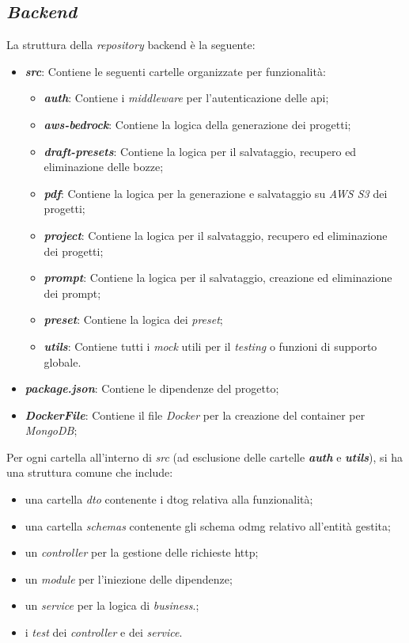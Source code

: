 \subsection{\textit{Backend}}
\label{sez:backend}

La struttura della \textit{repository} \gls{backend} è la seguente:

\begin{itemize}
    \item \textbf{\textit{src}}: Contiene le seguenti cartelle organizzate per funzionalità:
    \begin{itemize}
        \item \textbf{\textit{auth}}: Contiene i \textit{middleware} per l'autenticazione delle \gls{api};
        \item \textbf{\textit{aws-bedrock}}: Contiene la logica della generazione dei progetti;
        \item \textbf{\textit{draft-presets}}: Contiene la logica per il salvataggio, recupero ed eliminazione delle bozze;
        \item \textbf{\textit{pdf}}: Contiene la logica per la generazione e salvataggio su \textit{AWS S3} dei progetti;
        \item \textbf{\textit{project}}: Contiene la logica per il salvataggio, recupero ed eliminazione dei progetti;
        \item \textbf{\textit{prompt}}: Contiene la logica per il salvataggio, creazione ed eliminazione dei \gls{prompt};
        \item \textbf{\textit{preset}}: Contiene la logica dei \textit{preset};
        \item \textbf{\textit{utils}}: Contiene tutti i \textit{mock} utili per il \textit{testing} o funzioni di supporto globale.
    \end{itemize}
    \item \textbf{\textit{package.json}}: Contiene le dipendenze del progetto;
    \item \textbf{\textit{DockerFile}}: Contiene il file \textit{Docker} per la creazione del \gls{container} per \textit{MongoDB};
\end{itemize}

\noindent Per ogni cartella all'interno di \textit{src} (ad esclusione delle cartelle \textbf{\textit{auth}} e \textbf{\textit{utils}}), si ha una struttura comune che include:
\begin{itemize}
    \item una cartella \textit{dto} contenente i \gls{dtog} relativa alla funzionalità;
    \item una cartella \textit{schemas} contenente gli schema \gls{odmg} relativo all'entità gestita;
    \item un \textit{controller} per la gestione delle richieste \gls{http};
    \item un \textit{module} per l'iniezione delle dipendenze;
    \item un \textit{service} per la logica di \textit{business}.;
    \item i \textit{test} dei \textit{controller} e dei \textit{service}.
\end{itemize}

